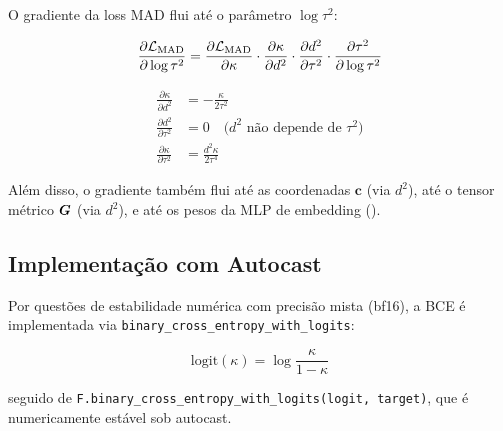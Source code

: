 O gradiente da loss MAD flui at\'e o par\^ametro $\log \tau^2$:

\begin{equation}
    \frac{\partial \mathcal{L}_{\text{MAD}}}{\partial \log \tau^2} =
    \frac{\partial \mathcal{L}_{\text{MAD}}}{\partial \kappa} \cdot
    \frac{\partial \kappa}{\partial d^2} \cdot
    \frac{\partial d^2}{\partial \tau^2} \cdot
    \frac{\partial \tau^2}{\partial \log \tau^2}
\end{equation}

\begin{align}
    \frac{\partial \kappa}{\partial d^2} &= -\frac{\kappa}{2\tau^2} \\
    \frac{\partial d^2}{\partial \tau^2} &= 0 \quad \text{($d^2$ n\~ao depende de $\tau^2$)} \\
    \frac{\partial \kappa}{\partial \tau^2} &= \frac{d^2 \kappa}{2\tau^4}
\end{align}

Al\'em disso, o gradiente tamb\'em flui at\'e as coordenadas $\bm{c}$
(via $d^2$), at\'e o tensor m\'etrico $\bm{G}$ (via $d^2$), e at\'e os
pesos da MLP de embedding ().

\subsection{Implementa\c{c}\~ao com Autocast}

Por quest\~oes de estabilidade num\'erica com precis\~ao mista (bf16),
a BCE \'e implementada via \texttt{binary\_cross\_entropy\_with\_logits}:

\begin{equation}
    \text{logit}(\kappa) = \log\frac{\kappa}{1 - \kappa}
\end{equation}

seguido de \texttt{F.binary\_cross\_entropy\_with\_logits(logit, target)},
que \'e numericamente est\'avel sob autocast.
